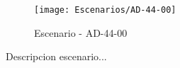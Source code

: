 \begin{figure}[H]
\centering
\texttt{[image: Escenarios/AD-44-00]}
\caption{Escenario - AD-44-00}
\label{fig:AD-44-00}
\end{figure}

Descripcion escenario...
\clearpage
